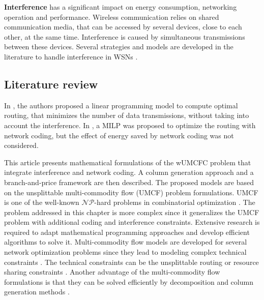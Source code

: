 \textbf{Interference} has a significant impact on energy consumption, networking operation and performance. Wireless communication relies on shared communication media, that can be accessed by several devices, close to each other, at the same time. Interference is caused by simultaneous transmissions between these devices. 
Several strategies and models are developed in the literature to handle interference in WSNs \cite{xin2011interference}.


\subsection{Literature review}
In \cite{ni2006routing}, the authors proposed a linear programming model to compute optimal routing, that minimizes the number of data transmissions, without taking into account the interference. In \cite{laube2016optimal}, a MILP was proposed to optimize the routing with network coding, but the effect of energy saved by network coding was not considered.

This article presents mathematical formulations of the wUMCFC problem that integrate interference and network coding. A column generation approach and a branch-and-price framework are then described.
The proposed models are based on the unsplittable multi-commodity flow (UMCF) problem formulations. UMCF is  one of the well-known \(\mathcal{NP}\)-hard problems in combinatorial optimization \cite{atamturk2002splittable,dinitz1999single,kleinberg1996single, kleinberg1998decision}. The problem addressed in this chapter is more complex since it generalizes the UMCF problem with additional coding and interference constraints. Extensive research is required to adapt mathematical programming approaches and develop efficient algorithms to solve it.
Multi-commodity flow models are developed for several network optimization problems since they lead to modeling complex technical constraints \cite{alvarez2012models, bauguion2018maximum, ben2007acceleration, gendron2019revisiting, leitner2020exact, vanier2018partition}. The technical constraints can be the unsplittable routing or resource sharing constraints \cite{atamturk2002splittable, kleinberg1998decision, haddad2019virtual}.
Another advantage of the multi-commodity flow formulations is that they can be solved efficiently by decomposition and column generation methods \cite{barnhart1998branch,gendron2014branch,haddad2019virtual,lubbecke2005selected, pessoa2018automation,vanier2018column}.

